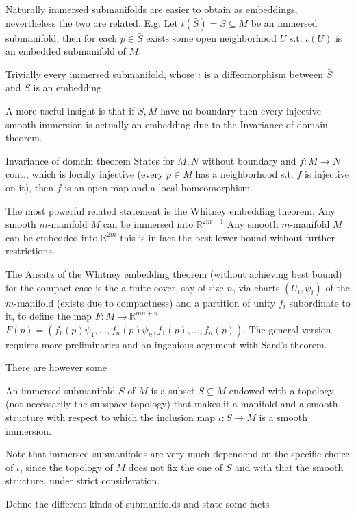 Naturally immersed submanifolds are easier to obtain as embeddings, nevertheless the two are related.
E.g.
Let \( \iota(\bar{S}) = S \subseteq M \) be an immersed submanifold, then for each \( p \in \bar{S} \) exists some open neighborhood \( U \)
s.t. \( \iota(U) \) is an embedded submanifold of \( M \).

Trivially every immersed submanifold, whose \( \iota \) is a diffeomorphism between \( \bar{S} \) and \( S \)  is an embedding

A more useful insight is that if \( \bar{S}, M \) have no boundary then every injective smooth immersion is actually an embedding
due to the Invariance of domain theorem.

Invariance of domain theorem
States for \( M, N \) without boundary and \( f : M \to N\) cont., which is locally injective
(every \( p \in M \) has a neighborhood s.t. \( f \) is injective on it), then \( f \) is an open
map and a local homeomorphism.

The most powerful related statement is the Whitney embedding theorem,
Any smooth \( m \)-manifold \( M \) can be immersed into \( \mathbb{R}^{2m-1} \)
Any smooth \( m \)-manifold \( M \) can be embedded into \( \mathbb{R}^{2m} \)
this is in fact the best lower bound without further restrictions.

The Ansatz of the Whitney embedding theorem (without achieving best bound) for the compact case
is the a finite cover, say of size \( n \), via charts \( (U_i, \psi_i) \) of the \( m \)-manifold (exists due to compactness)
and a partition of unity \( f_i \) subordinate to it, to define the map \( F : M \to \mathbb{R}^{mn + n} \)
\( F(p) = (f_1(p)\psi_1, \dots, f_n(p)\psi_n, f_1(p), \dots, f_n(p))\).
The general version requires more preliminaries and an ingenious argument with Sard's theorem.


There are however some 

An immersed submanifold \( S \) of \( M \) is a subset \( S \subseteq M \) endowed with a topology (not necessarily the subspace topology)
that makes it a manifold and a smooth structure with respect to which the inclusion map \( \iota : S \to M\) is a smooth immersion.

Note that immersed submanifolds are very much dependend on the specific choice of \( \iota \), since the topology of \( M \) does not fix the one of \( S \)
and with that the smooth structure.  under strict consideration.


Define the different kinds of submanifolds and state some facts

